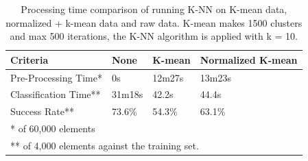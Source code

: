 \begin{table}[H]
\centering
\begin{tabular}{|l|p{2cm}|p{2cm}|p{2cm}|}\hline
Criteria & None & K-mean & Normalized K-mean \\ \hline
Pre-Processing Time* & 0s & 12m27s & 13m23s \\ \hline
Classification Time** & 31m18s & 42.2s & 44.4s \\ \hline
Success Rate** & 73.6\% & 54.3\% & 63.1\% \\ \hline
\multicolumn{4}{|l|}{* of 60,000 elements} \\ 
\multicolumn{4}{|l|}{** of 4,000 elements against the training set.} \\ \hline
\end{tabular}
\caption{Processing time comparison of running K-NN on K-mean data, normalized + k-mean data and raw data. K-mean makes 1500 clusters and max 500 iterations, the K-NN algorithm is applied with k = 10.}
\label{tab:processingtime_kmean_vs_raw_knn}
\end{table}